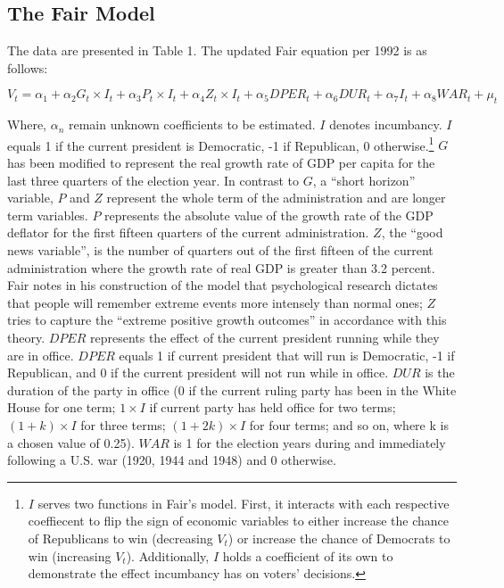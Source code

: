 \documentclass[11,]{article}
\let\rmarkdownfootnote\footnote%
\def\footnote{\protect\rmarkdownfootnote}
\begin{document}
\hypertarget{the-fair-model}{%
\subsection{The Fair Model}\label{the-fair-model}}

The data are presented in Table 1. The updated Fair equation per 1992 is
as follows:

\[ V_t = \alpha_1 + \alpha_2 G_t\times I_t + \alpha_3 P_t\times I_t + \alpha_4 Z_t\times I_t + \alpha_5 {DPER_t} + \alpha_6 {DUR_t} +\alpha_7 I_t + \alpha_8 {WAR_t} + \mu_t \]

Where, \(\alpha_n\) remain unknown coefficients to be estimated. \(I\)
denotes incumbancy. \(I\) equals 1 if the current president is
Democratic, -1 if Republican, 0 otherwise.\footnote{\(I\) serves two
  functions in Fair's model. First, it interacts with each respective
  coeffiecent to flip the sign of economic variables to either increase
  the chance of Republicans to win (decreasing \(V_t\)) or increase the
  chance of Democrats to win (increasing \(V_t\)). Additionally, \(I\)
  holds a coefficient of its own to demonstrate the effect incumbancy
  has on voters' decisions.} \(G\) has been modified to represent the
real growth rate of GDP per capita for the last three quarters of the
election year. In contrast to \(G\), a ``short horizon'' variable, \(P\)
and \(Z\) represent the whole term of the administration and are longer
term variables. \(P\) represents the absolute value of the growth rate
of the GDP deflator for the first fifteen quarters of the current
administration. \(Z\), the ``good news variable'', is the number of
quarters out of the first fifteen of the current administration where
the growth rate of real GDP is greater than 3.2 percent. Fair notes in
his construction of the model that psychological research dictates that
people will remember extreme events more intensely than normal ones;
\(Z\) tries to capture the ``extreme positive growth outcomes'' in
accordance with this theory. \(DPER\) represents the effect of the
current president running while they are in office. \(DPER\) equals 1 if
current president that will run is Democratic, -1 if Republican, and 0
if the current president will not run while in office. \(DUR\) is the
duration of the party in office (0 if the current ruling party has been
in the White House for one term; \(1\times I\) if current party has held
office for two terms; \((1+k) \times I\) for three terms;
\((1+2k)\times I\) for four terms; and so on, where k is a chosen value
of 0.25). \(WAR\) is 1 for the election years during and immediately
following a U.S. war (1920, 1944 and 1948) and 0 otherwise.
\end{document}
